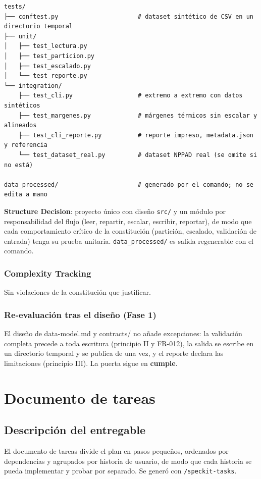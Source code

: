 \documentclass[12pt,a4paper]{article}
\newenvironment{documentogenerado}[2]{%
  \def\doccomando{#1}\def\docruta{#2}%
  \par\begingroup\small\setstretch{1.15}\sloppy%
}{\endgroup\par\medskip}
\begin{document}
\begin{documentogenerado}{/speckit-plan}{specs\slash 001-preparacion-datos\slash plan.md}
\begin{Verbatim}[breaklines,breakanywhere]
tests/
├── conftest.py                      # dataset sintético de CSV en un directorio temporal
├── unit/
│   ├── test_lectura.py
│   ├── test_particion.py
│   ├── test_escalado.py
│   └── test_reporte.py
└── integration/
    ├── test_cli.py                  # extremo a extremo con datos sintéticos
    ├── test_margenes.py             # márgenes térmicos sin escalar y alineados
    ├── test_cli_reporte.py          # reporte impreso, metadata.json y referencia
    └── test_dataset_real.py         # dataset NPPAD real (se omite si no está)

data_processed/                      # generado por el comando; no se edita a mano
\end{Verbatim}

\textbf{Structure Decision}: proyecto único con diseño \texttt{src/} y un módulo por responsabilidad del flujo (leer, repartir, escalar, escribir, reportar), de modo que cada comportamiento crítico de la constitución (partición, escalado, validación de entrada) tenga su prueba unitaria. \texttt{data\_\allowbreak{}processed/} es salida regenerable con el comando.

\subsubsection{Complexity Tracking}

Sin violaciones de la constitución que justificar.

\subsubsection{Re-evaluación tras el diseño (Fase 1)}

El diseño de data-model.md y contracts/ no añade excepciones: la validación completa precede a toda escritura (principio II y FR-012), la salida se escribe en un directorio temporal y se publica de una vez, y el reporte declara las limitaciones (principio III). La puerta sigue en \textbf{cumple}.
\end{documentogenerado}

\newpage
\section{Documento de tareas}

\subsection{Descripción del entregable}
El documento de tareas divide el plan en pasos pequeños, ordenados por dependencias y agrupados por historia de usuario, de modo que cada historia se pueda implementar y probar por separado. Se generó con \texttt{/speckit-tasks}.
\end{document}
